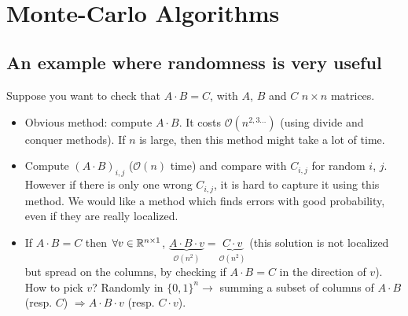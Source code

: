 \begin{figure}[h!]%
    \centering
    ~
		\\
		\caption{} 
		\label{fig:R_A_integration}
\end{figure}

\section{Monte-Carlo Algorithms}
\subsection{An example where randomness is very useful}

Suppose you want to check that $A\cdot B=C$, with $A$, $B$ and $C$ $n\times n$ matrices.
\begin{itemize}
	\item Obvious method: compute $A\cdot B$. It costs $\mathcal{O}(n^{2,3\hdots})$ (using divide and conquer methods). If $n$ is large, then this method might take a lot of time.
	\item Compute $\left( A\cdot B\right)_{i,j}$ ($\mathcal{O}(n)$ time) and compare with $C_{i,j}$ for random $i$, $j$. However if there is only one wrong $C_{i,j}$, it is hard to capture it using this method. We would like a method which finds errors with good probability, even if they are really localized.
	\item If $A\cdot B=C$ then $\forall v\in \mathbb{R}^{n\times 1}$, $\underbrace{A\cdot B\cdot v}_{\mathcal{O}(n^2)}=\underbrace{C\cdot v}_{\mathcal{O}(n^2)}$ (this solution is not localized but spread on the columns, by checking if $A\cdot B=C$ in the direction of $v$). How to pick $v$? Randomly in $\{0,1\}^n\rightarrow$ summing a subset of columns of $A\cdot B$ (resp. $C$) $\Rightarrow A\cdot B \cdot v$ (resp. $C\cdot v$).\\
\end{itemize}

